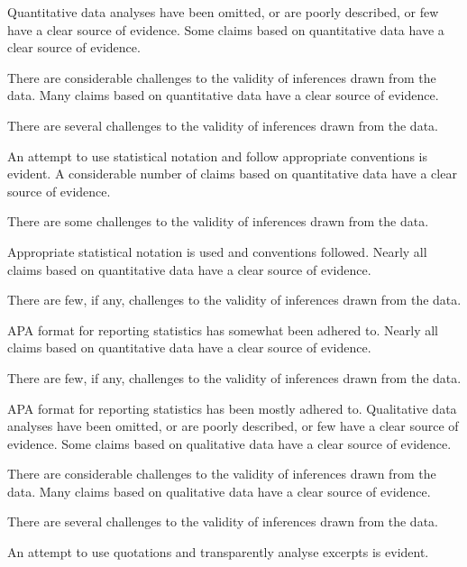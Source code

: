 \documentclass{../fal_assignment}
\begin{document}
\begin{markingrubric}
%
        \grade\fail 	Quantitative data analyses have been omitted, or are poorly described, or few have a clear source of evidence.
        \grade		Some claims based on quantitative data have a clear source of evidence.
	\par 		There are considerable challenges to the validity of inferences drawn from the data.
        \grade		Many claims based on quantitative data have a clear source of evidence.
        \par 		There are several challenges to the validity of inferences drawn from the data.
	\par 		An attempt to use statistical notation and follow appropriate conventions is evident.
        \grade		A considerable number of claims based on quantitative data have a clear source of evidence.
        \par		There are some challenges to the validity of inferences drawn from the data.
        \par 		Appropriate statistical notation is used and conventions followed.
        \grade		Nearly all claims based on quantitative data have a clear source of evidence.
        \par		There are few, if any, challenges to the validity of inferences drawn from the data.
        \par 		APA format for reporting statistics has somewhat been adhered to.
        \grade		Nearly all claims based on quantitative data have a clear source of evidence.
        \par		There are few, if any, challenges to the validity of inferences drawn from the data.
        \par 		APA format for reporting statistics has been mostly adhered to.
%
        \grade\fail 	Qualitative data analyses have been omitted, or are poorly described, or few have a clear source of evidence.
        \grade		Some claims based on qualitative data have a clear source of evidence.
	\par 		There are considerable challenges to the validity of inferences drawn from the data.
        \grade		Many claims based on qualitative data have a clear source of evidence.
        \par 		There are several challenges to the validity of inferences drawn from the data.
	\par 		An attempt to use quotations and transparently analyse excerpts is evident.

\end{markingrubric}
\end{document}

